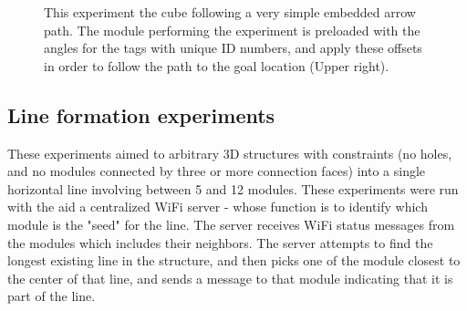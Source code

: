 \begin{figure}[h]
\begin{subfigure}[b]{0.23\linewidth}
	\end{subfigure}
	\caption{This experiment the cube following a very simple embedded arrow path. The module performing the experiment is preloaded with the angles for the tags with unique ID numbers, and apply these offsets in order to follow the path to the goal location (Upper right).}
	\label{fig:arrowExperiment}
\end{figure}

\subsection{Line formation experiments}
\label{sec:mblocksExperimentsLine}

These experiments aimed to arbitrary 3D structures with constraints (no holes, and no modules connected by three or more connection faces) into a single horizontal line involving between 5 and 12 modules. These experiments were run with the aid a centralized WiFi server - whose function is to identify which module is the "seed" for the line. The server receives WiFi  status messages from the modules which includes their neighbors. The server attempts to find the longest existing line in the structure, and then picks one of the module closest to the center of that line, and sends a message to that module indicating that it is part of the line. 


